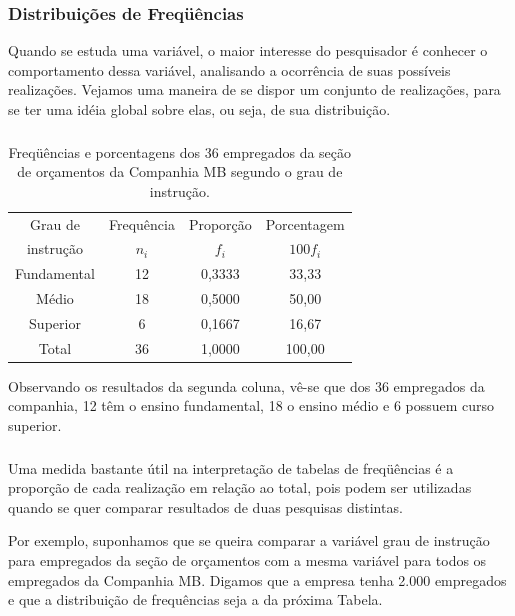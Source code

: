 \documentclass[14pt,aspectratio=1610]{beamer}
\begin{document}
\begin{frame}{}
\frametitle{Distribuições de Freqüências}
\begin{block}{}
\justifying
Quando se estuda uma variável, o maior interesse do pesquisador é conhecer o comportamento dessa variável, analisando a ocorrência de suas possíveis realizações. 
Vejamos uma maneira de se dispor um conjunto de realizações, para se ter uma idéia global sobre elas, ou seja, de sua distribuição.
\end{block}
\end{frame}

\begin{frame}{}
\frametitle{}
\begin{block}{}
\justifying
\begin{table}[H]
\caption{Freqüências e porcentagens dos 36 empregados da seção de orçamentos da Companhia MB segundo o grau de instrução.}
\label{tab2}
\begin{tabular}{c|c|c|c}
\hline
Grau de   &Frequência&Proporção&Porcentagem\\
instrução &$n_{i}$   &$f_{i}$  &$100f_{i}$ \\
\hline
Fundamental&12       &0,3333   &33,33      \\
Médio      &18       &0,5000   &50,00      \\
Superior   & 6       &0,1667   &16,67      \\
\hline
Total      &36       &1,0000   &100,00     \\
\hline
\end{tabular}
\end{table}
Observando os resultados da segunda coluna, vê-se que dos 36 empregados da companhia,
12 têm o ensino fundamental, 18 o ensino médio e 6 possuem curso superior.
\end{block}
\end{frame}

\begin{frame}{}
\frametitle{}
\begin{block}{}
\justifying
Uma medida bastante útil na interpretação de tabelas de freqüências é a proporção de
cada realização em relação ao total, pois podem ser utilizadas quando se quer comparar
resultados de duas pesquisas distintas.
\end{block}
\pause
\begin{block}{}
\justifying
Por exemplo, suponhamos que se queira comparar a variável grau de instrução para empregados da seção de orçamentos com a mesma variável para todos os 
empregados da Companhia MB. Digamos que a empresa tenha 2.000 empregados e que a distribuição de frequências seja a da próxima Tabela.
\end{block}
\end{frame}
\end{document}

